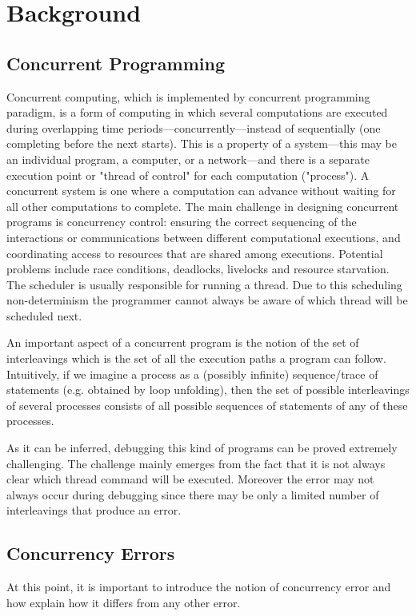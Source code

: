 \chapter{Background}
\label{Chapter 2}

\section{Concurrent Programming}

Concurrent computing, which is implemented by concurrent programming paradigm, is a form of computing in which several 
computations are executed during overlapping time 
periods—concurrently—instead of sequentially (one completing before the next starts). 
This is a property of a system—this may be an individual program, a computer, or a network—and there is a separate execution point 
or "thread of control" for each computation ("process"). A concurrent system is one where a computation can advance without waiting for 
all other computations to complete.
The main challenge in designing concurrent programs is concurrency control: ensuring the correct sequencing of the 
interactions or communications between different computational executions, and coordinating access to resources that are shared among executions.
Potential problems include race conditions, deadlocks, livelocks and resource starvation. 
The scheduler is usually responsible for running a thread. Due to this scheduling non-determinism the programmer cannot always be aware of which thread
will be scheduled next.

An important aspect of a concurrent program is the notion of the set of interleavings which is the set of all the execution paths a program can follow.
Intuitively, if we imagine a process as a (possibly infinite) sequence/trace of statements (e.g. obtained by loop unfolding),
then the set of possible interleavings of several processes consists of all possible sequences of statements of any of these processes.

As it can be inferred, debugging this kind of programs can be proved extremely challenging. The challenge mainly emerges from the fact that it is 
not always clear which thread command will be executed. Moreover the error may not always occur during debugging since there may be only a limited
number of interleavings that produce an error. 

\section{Concurrency Errors}
At this point, it is important to introduce the notion of concurrency error and how explain how it differs from any other error.

